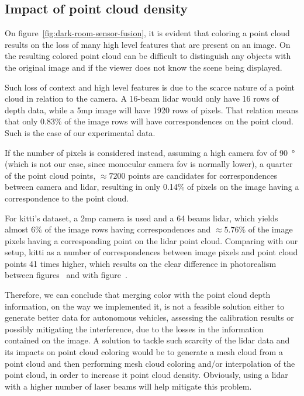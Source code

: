 \subsection{Impact of point cloud density}
On figure~\ref{fig:dark-room-sensor-fusion}, it is evident that coloring a point cloud results on the loss of many high level features that are present on an image. On the resulting colored point cloud can be difficult to distinguish any objects with the original image and if the viewer does not know the scene being displayed.

Such loss of context and high level features is due to the scarce nature of a point cloud in relation to the camera. A 16-beam \ac{lidar} would only have 16 rows of depth data, while a 5\ac{mp} image will have 1920 rows of pixels. That relation means that only 0.83\% of the image rows will have correspondences on the point cloud. Such is the case of our experimental data.

If the number of pixels is considered instead, assuming a high camera \ac{fov} of \SI{90}{\degree} (which is not our case, since monocular camera \ac{fov} is normally lower), a quarter of the point cloud points, $\approx 7200$ points are candidates for correspondences between camera and \ac{lidar}, resulting in only 0.14\% of pixels on the image having a correspondence to the point cloud. 

For \ac{kitti}'s dataset, a 2\ac{mp} camera is used and a 64 beams \ac{lidar}, which yields almost 6\% of the image rows having correspondences and $\approx 5.76\%$ of the image pixels having a corresponding point on the \ac{lidar} point cloud. Comparing with our setup, \ac{kitti} as a number of correspondences between image pixels and point cloud points 41 times higher, which results on the clear difference in photorealism between figures~\cite{fig:cambada-sensor-fusion} and \cite{fig:dark-room-sensor-fusion} with figure~\cite{fig:kitti-sensor-fusion}.

Therefore, we can conclude that merging color with the point cloud depth information, on the way we implemented it, is not a feasible solution either to generate better data for autonomous vehicles, assessing the calibration results or possibly mitigating the interference, due to the losses in the information contained on the image. A solution to tackle such scarcity of the \ac{lidar} data and its impacts on point cloud coloring would be to generate a mesh cloud  from a point cloud and then performing mesh cloud coloring and/or interpolation of the point cloud, in order to increase it point cloud density. Obviously, using a \ac{lidar} with a higher number of laser beams will help mitigate this problem.

